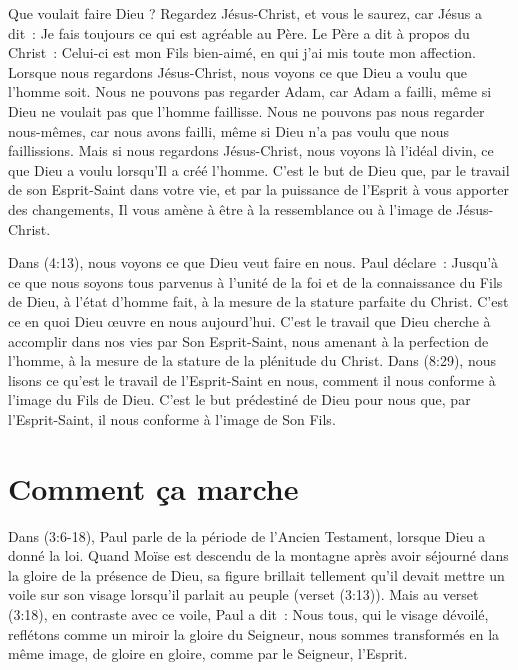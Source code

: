 Que voulait faire Dieu ?
 Regardez Jésus-Christ, et vous le saurez, car Jésus a dit~:
 \og Je fais toujours ce qui est agréable au Père. \fg{}
 Le Père a dit à propos du Christ~:
 \og Celui-ci est mon Fils bien-aimé, en qui j'ai mis toute mon affection. \fg{}
 Lorsque nous regardons Jésus-Christ,
 nous voyons ce que Dieu a voulu que l'homme soit.
 Nous ne pouvons pas regarder Adam, car Adam a failli,
 même si Dieu ne voulait pas que l'homme faillisse.
 Nous ne pouvons pas nous regarder nous-mêmes,
 car nous avons failli, même si Dieu n'a pas voulu que nous faillissions.
 Mais si nous regardons Jésus-Christ, nous voyons là l'idéal divin,
 ce que Dieu a voulu lorsqu'Il a créé l'homme.
 C'est le but de Dieu que, par le travail de son Esprit-Saint dans votre vie,
 et par la puissance de l'Esprit à vous apporter des changements,
 Il vous amène à être à la ressemblance ou à l'image de Jésus-Christ.

Dans (4:13), nous voyons ce que Dieu veut faire en nous.
 Paul déclare~:
 \og Jusqu'à ce que nous soyons tous parvenus à l'unité de la foi
 et de la connaissance du Fils de Dieu, à l'état d'homme fait,
 à la mesure de la stature parfaite du Christ. \fg{}
 C'est ce en quoi Dieu œuvre en nous aujourd'hui.
 C'est le travail que Dieu cherche à accomplir dans nos vies
 par Son Esprit-Saint, nous amenant à la perfection de l'homme,
 à la mesure de la stature de la plénitude du Christ.
 Dans (8:29), nous lisons
 ce qu'est le travail de l'Esprit-Saint en nous,
 comment il nous conforme à l'image du Fils de Dieu.
 C'est le but prédestiné de Dieu pour nous
 que, par l'Esprit-Saint, il nous conforme à l'image de Son Fils.


\section*{Comment ça marche}

Dans (3:6-18), Paul parle de la période
 de l'Ancien Testament, lorsque Dieu a donné la loi.
 Quand Moïse est descendu de la montagne après avoir séjourné
 dans la gloire de la présence de Dieu,
 sa figure brillait tellement qu'il devait mettre un voile sur son visage
 lorsqu'il parlait au peuple (verset (3:13)).
 Mais au verset (3:18), en contraste avec ce voile,
 Paul a dit~:
 \og Nous tous, qui le visage dévoilé, reflétons comme un miroir
 la gloire du Seigneur, nous sommes transformés en la même image,
 de gloire en gloire, comme par le Seigneur,
 l'Esprit. \fg{}

